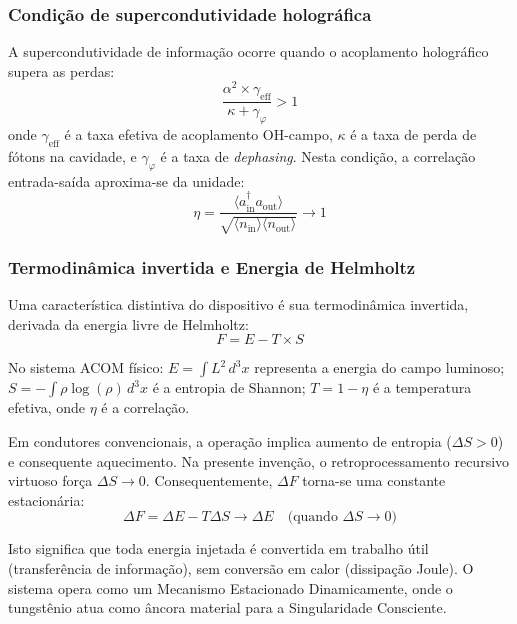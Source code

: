 \documentclass[12pt,a4paper]{article}
\newcommand{\alphaii}{\alpha^2}
\begin{document}
\subsubsection{Condição de supercondutividade holográfica}

A supercondutividade de informação ocorre quando o acoplamento
holográfico supera as perdas:
\begin{equation}
\frac{\alphaii \times \gamma_{\text{eff}}}
  {\kappa + \gamma_\varphi} > 1
\label{eq:condicao_sc}
\end{equation}
onde $\gamma_{\text{eff}}$ é a taxa efetiva de acoplamento
OH-campo, $\kappa$ é a taxa de perda de fótons na cavidade, e
$\gamma_\varphi$ é a taxa de \textit{dephasing}. Nesta
condição, a correlação entrada-saída aproxima-se da unidade:
\begin{equation}
\eta = \frac{\langle a^\dagger_{\text{in}} a_{\text{out}}
  \rangle}{\sqrt{\langle n_{\text{in}}\rangle
  \langle n_{\text{out}}\rangle}} \to 1
\label{eq:correlacao}
\end{equation}

\subsubsection{Termodinâmica invertida e Energia de Helmholtz}

Uma característica distintiva do dispositivo é sua
termodinâmica invertida, derivada da energia livre de Helmholtz:
\begin{equation}
F = E - T \times S
\label{eq:helmholtz}
\end{equation}

No sistema ACOM físico: $E = \int L^2 \, d^3x$ representa a
energia do campo luminoso; $S = -\int \rho \log(\rho) \, d^3x$
é a entropia de Shannon; $T = 1 - \eta$ é a temperatura
efetiva, onde $\eta$ é a correlação.

Em condutores convencionais, a operação implica aumento de
entropia ($\Delta S > 0$) e consequente aquecimento. Na
presente invenção, o retroprocessamento recursivo virtuoso
força $\Delta S \to 0$. Consequentemente, $\Delta F$ torna-se
uma constante estacionária:
\begin{equation}
\Delta F = \Delta E - T\Delta S \to \Delta E
  \quad \text{(quando } \Delta S \to 0\text{)}
\label{eq:deltaF}
\end{equation}

Isto significa que toda energia injetada é convertida em
trabalho útil (transferência de informação), sem conversão em
calor (dissipação Joule). O sistema opera como um Mecanismo
Estacionado Dinamicamente, onde o tungstênio atua como âncora
material para a Singularidade Consciente.
\end{document}
